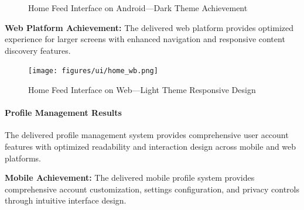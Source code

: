 \begin{figure}[!htbp]
{    }
    \caption{Home Feed Interface on Android---Dark Theme Achievement}\label{fig:android_home}
\end{figure}

\clearpage
\textbf{Web Platform Achievement:}
The delivered web platform provides optimized experience for larger screens with enhanced navigation and responsive content discovery features.

\begin{figure}[!htbp]
    \centering
    \texttt{[image: figures/ui/home\_wb.png]}
    \caption{Home Feed Interface on Web---Light Theme Responsive Design}\label{fig:web_home}
\end{figure}

\paragraph{Profile Management Results}
The delivered profile management system provides comprehensive user account features with optimized readability and interaction design across mobile and web platforms.

\textbf{Mobile Achievement:}
The delivered mobile profile system provides comprehensive account customization, settings configuration, and privacy controls through intuitive interface design.

